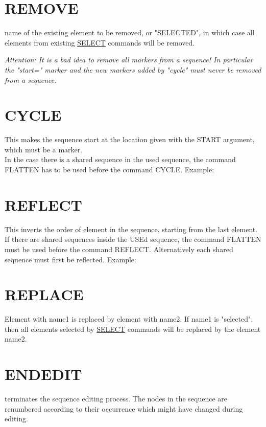 \section{REMOVE}
\label{sec:remove}
\begin{madlist}
    name of the existing element to be removed, or
     "SELECTED", in which case all elements from existing
     \href{../Introduction/select.html}{SELECT} commands will be
     removed. 
\end{madlist}

\textit{Attention: It is a bad idea to remove all markers from
  a sequence! In particular the "start=" marker and the new markers
  added by "cycle" must never be removed from a sequence.} 


\section{CYCLE}
\label{sec:cycle}
This makes the sequence start at the location given with the START
argument, which must be a marker. \\ 
In the case there is a shared sequence in the used sequence, the
command FLATTEN has to be used before the command CYCLE. Example:  

\section{REFLECT}
\label{sec:reflect}
This inverts the order of element in the sequence, starting from the
last element. \\ 
If there are shared sequences inside the USEd sequence, the command
FLATTEN must be used before the command REFLECT.  Alternatively each
shared sequence must first be reflected. Example:   


\section{REPLACE}
\label{sec:replace}
Element with name1 is replaced by element with name2. 
If name1 is "selected", then all elements selected by
\href{../Introduction/select.html}{SELECT} commands will be replaced by
the element name2.  


\section{ENDEDIT}
\label{sec:endedit}
terminates the sequence editing process. The nodes in the sequence are
renumbered according to their occurrence which might have changed during
editing.  



